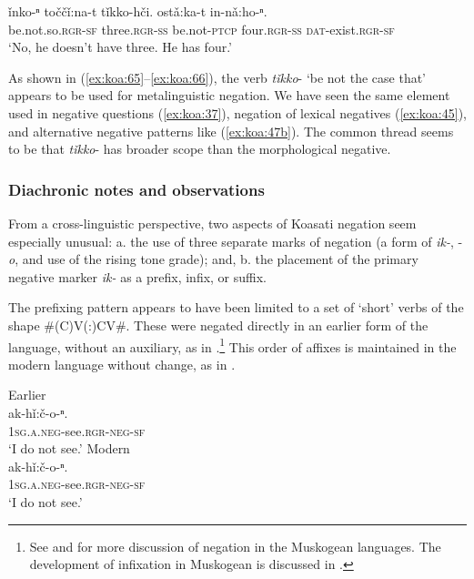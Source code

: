 \documentclass[output=paper,colorlinks,citecolor=brown]{langscibook}
\begin{document}
\ea\label{ex:koa:66}
    \gll \v{i}nko-ⁿ  točč\v{i}:na-t  t\v{i}kko-hči. ost\v{a}:ka-t  in-n\v{a}:ho-ⁿ.\\ 
         be.not.so.\textsc{rgr-sf}  three.\textsc{rgr-ss}  be.not-\textsc{ptcp} four.\textsc{rgr-ss}  \textsc{dat}-exist.\textsc{rgr-sf} \\
    \glt ‘No, he doesn’t have three. He has four.’
\z 

As shown in (\ref{ex:koa:65}--\ref{ex:koa:66}), the verb \textit{tǐkko}- ‘be not the case that' appears to be used for metalinguistic negation. We have seen the same element used in negative questions (\ref{ex:koa:37}), negation of lexical negatives (\ref{ex:koa:45}), and alternative negative patterns like (\ref{ex:koa:47b}). The common thread seems to be that \textit{tǐkko}- has broader scope than the morphological negative.

\subsubsection{Diachronic notes and observations}\label{sec:koa:4.6.3}

From a cross-linguistic perspective, two aspects of Koasati negation seem especially unusual: a. the use of three separate marks of negation (a form of \textit{ik-}, -\textit{o}, and use of the rising tone grade); and, b. the placement of the primary negative marker \textit{ik-} as a prefix, infix, or suffix. 

The prefixing pattern appears to have been limited to a set of ‘short’ verbs of the shape \#(C)V(:)CV\#. These were negated directly in an earlier form of the language, without an auxiliary, as in .\footnote{See \citet{Booker1980} and \citet{MartinMunro2005} for more discussion of negation in the Muskogean languages. The development of infixation in Muskogean is discussed in \citet{Yu2007}.} This order of affixes is maintained in the modern language without change, as in . 

\ea\label{ex:koa:67} %
    \ea Earlier {\label{ex:koa:67a}\\
    \gll ak-hǐ:č-o-ⁿ.\\ 
         1\textsc{sg.a}.\textsc{neg}-see.\textsc{rgr}-\textsc{neg}-\textsc{sf} \\
    \glt ‘I do not see.’} 
    \ex Modern {\label{ex:koa:67b}\\
    \gll ak-hǐ:č-o-ⁿ.\\
    1\textsc{sg.a}.\textsc{neg}-see.\textsc{rgr}-\textsc{neg}-\textsc{sf} \\
    \glt ‘I do not see.’}
    \z 
\z 
\end{document}
